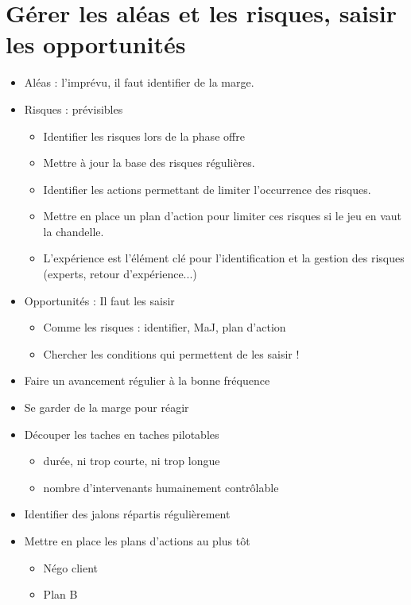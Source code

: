 \documentclass[10pt,a4paper]{article}
\begin{document}
\section{Gérer les aléas et les risques, saisir les opportunités}
\begin{itemize}
\item Aléas : l'imprévu, il faut identifier de la marge.
\item Risques : prévisibles
\begin{itemize}
\item Identifier les risques lors de la phase offre
\item Mettre à jour la base des risques régulières.
\item Identifier les actions permettant de limiter l'occurrence des risques.
\item  Mettre en place un plan d'action pour limiter ces risques si le jeu en vaut la chandelle.
\item L'expérience est l'élément clé pour l'identification et la gestion des risques (experts, retour d'expérience...)
\end{itemize}
\item Opportunités : Il faut les saisir
\begin{itemize}
\item Comme les risques : identifier, MaJ, plan d'action
\item Chercher les conditions qui permettent de les saisir !
\end{itemize}
\end{itemize}
\begin{itemize}
\item Faire un avancement régulier à la bonne fréquence
\item Se garder de la marge pour réagir
\item Découper les taches en taches pilotables
\begin{itemize}
\item durée, ni trop courte, ni trop longue
\item nombre d'intervenants humainement contrôlable
\end{itemize}
\item Identifier des jalons répartis régulièrement
\item Mettre en place les plans d'actions au plus tôt
\begin{itemize}
\item Négo client
\item Plan B
\end{itemize}
\end{itemize}
\end{document}
